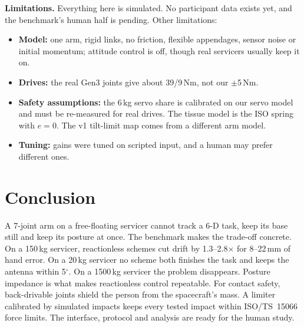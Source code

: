 \documentclass[conference]{IEEEtran}
\begin{document}
\textbf{Limitations.} Everything here is simulated. No participant data exists yet, and the benchmark's
human half is pending. Other limitations:
\begin{itemize}
\item \textbf{Model:} one arm, rigid links, no friction, flexible appendages, sensor noise or initial
momentum; attitude control is off, though real servicers usually keep it on.
\item \textbf{Drives:} the real Gen3 joints give about 39/9\,Nm, not our $\pm$5\,Nm.
\item \textbf{Safety assumptions:} the 6\,kg servo share is calibrated on our servo model and must be
re-measured for real drives. The tissue model is the ISO spring with $e=0$. The v1 tilt-limit map comes
from a different arm model.
\item \textbf{Tuning:} gains were tuned on scripted input, and a human may prefer different ones.
\end{itemize}

\section{Conclusion}
A 7-joint arm on a free-floating servicer cannot track a 6-D task, keep its base still and keep its posture
at once. The benchmark makes the trade-off concrete. On a 150\,kg servicer, reactionless schemes cut drift by
1.3--2.8$\times$ for 8--22\,mm of hand error. On a 20\,kg servicer no scheme both finishes the task and keeps
the antenna within 5$^\circ$. On a 1500\,kg servicer the problem disappears. Posture impedance is what makes
reactionless control repeatable. For contact safety, back-drivable joints shield the person from the
spacecraft's mass. A limiter calibrated by simulated impacts keeps every tested impact within ISO/TS~15066
force limits. The interface, protocol and analysis are ready for the human study.



\end{document}
